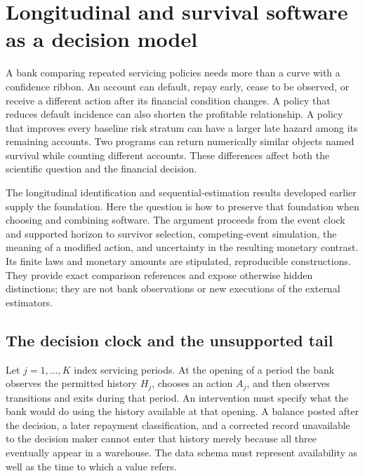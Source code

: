 \chapter{Longitudinal and survival software as a decision model}
\label{exec17:s5}

A bank comparing repeated servicing policies needs more than a curve with a
confidence ribbon. An account can default, repay early, cease to be observed,
or receive a different action after its financial condition changes. A policy
that reduces default incidence can also shorten the profitable relationship.
A policy that improves every baseline risk stratum can have a larger late
hazard among its remaining accounts. Two programs can return numerically
similar objects named survival while counting different accounts. These
differences affect both the scientific question and the financial decision.

The longitudinal identification and sequential-estimation results developed
earlier supply the foundation. Here the question is how to preserve that
foundation when choosing and combining software. The argument proceeds from
the event clock and supported horizon to survivor selection, competing-event
simulation, the meaning of a modified action, and uncertainty in the resulting
monetary contrast. Its finite laws and monetary amounts are stipulated,
reproducible constructions. They provide exact comparison references and
expose otherwise hidden distinctions; they are not bank observations or new
executions of the external estimators.\citep{exec17_s5_math}

\section{The decision clock and the unsupported tail}
\label{exec17:s5-horizon}

Let $j=1,\ldots,K$ index servicing periods. At the opening of a period the
bank observes the permitted history $H_j$, chooses an action $A_j$, and then
observes transitions and exits during that period. An intervention must specify
what the bank would do using the history available at that opening. A balance
posted after the decision, a later repayment classification, and a corrected
record unavailable to the decision maker cannot enter that history merely
because all three eventually appear in a warehouse. The data schema must
represent availability as well as the time to which a value refers.

